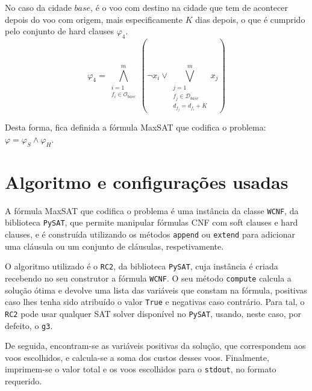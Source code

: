 \documentclass[12pt,a4paper]{article}
\begin{document}
        No caso da cidade $base$, é o voo com destino na cidade que tem de acontecer depois do voo com origem, mais especificamente $K$ dias depois, o que é cumprido pelo conjunto de hard clauses $\varphi_4$.
        \begin{equation}
            \varphi_4 =
            \bigwedge_{\substack{i = 1 \\
                                 f_i \in \mathcal{O}_{base}}}
                     ^{m}
            \left(
            \neg x_i \lor
            \bigvee_{\substack{j = 1 \\
                               f_j \in \mathcal{D}_{base} \\
                               d_{f_j} = d_{f_i} + K}}
                ^{m}
                {x_j}
            \right)
            \label{K_nights_base}
        \end{equation}

        \vspace{\baselineskip}
        \vspace{\baselineskip}
        \vspace{\baselineskip}
        \noindent Desta forma, fica definida a fórmula MaxSAT que codifica o problema: $\varphi = \varphi_S \land \varphi_H$.

    \section{Algoritmo e configurações usadas}
        A fórmula MaxSAT que codifica o problema é uma instância da classe \texttt{WCNF}, da biblioteca \texttt{PySAT}, que permite manipular fórmulas CNF com soft clauses e hard clauses, e é construída utilizando os métodos \texttt{append} ou \texttt{extend} para adicionar uma cláusula ou um conjunto de cláusulas, respetivamente.

        O algoritmo utilizado é o \texttt{RC2}, da biblioteca \texttt{PySAT}, cuja instância é criada recebendo no seu construtor a fórmula \texttt{WCNF}. O seu método \texttt{compute} calcula a solução ótima e devolve uma lista das variáveis que constam na fórmula, positivas caso lhes tenha sido atribuído o valor \texttt{True} e negativas caso contrário. Para tal, o \texttt{RC2} pode usar qualquer SAT solver disponível no \texttt{PySAT}, usando, neste caso, por defeito, o \texttt{g3}.

        De seguida, encontram-se as variáveis positivas da solução, que correspondem aos voos escolhidos, e calcula-se a soma dos custos desses voos. Finalmente, imprimem-se o valor total e os voos escolhidos para o \texttt{stdout}, no formato requerido.
\end{document}

